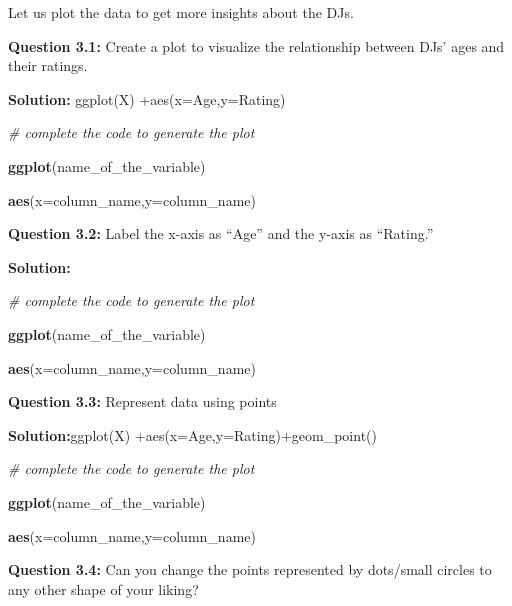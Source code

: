 \documentclass[
]{article}
\newenvironment{Shaded}{\begin{snugshade}}{\end{snugshade}}
\newcommand{\AttributeTok}[1]{\textcolor[rgb]{0.13,0.29,0.53}{#1}}
\newcommand{\CommentTok}[1]{\textcolor[rgb]{0.56,0.35,0.01}{\textit{#1}}}
\newcommand{\FunctionTok}[1]{\textcolor[rgb]{0.13,0.29,0.53}{\textbf{#1}}}
\newcommand{\NormalTok}[1]{#1}
\begin{document}
Let us plot the data to get more insights about the DJs.

\textbf{Question 3.1:} Create a plot to visualize the relationship
between DJs' ages and their ratings.

\textbf{Solution:} ggplot(X) +aes(x=Age,y=Rating)

\begin{Shaded}
\begin{Highlighting}[]
\CommentTok{\# complete the code to generate the plot}

\FunctionTok{ggplot}\NormalTok{(name\_of\_the\_variable) }

\FunctionTok{aes}\NormalTok{(}\AttributeTok{x=}\NormalTok{column\_name,}\AttributeTok{y=}\NormalTok{column\_name)}
\end{Highlighting}
\end{Shaded}

\textbf{Question 3.2:} Label the x-axis as ``Age'' and the y-axis as
``Rating.''

\textbf{Solution:}

\begin{Shaded}
\begin{Highlighting}[]
\CommentTok{\# complete the code to generate the plot}

\FunctionTok{ggplot}\NormalTok{(name\_of\_the\_variable) }

\FunctionTok{aes}\NormalTok{(}\AttributeTok{x=}\NormalTok{column\_name,}\AttributeTok{y=}\NormalTok{column\_name)}
\end{Highlighting}
\end{Shaded}

\textbf{Question 3.3:} Represent data using points

\textbf{Solution:}ggplot(X) +aes(x=Age,y=Rating)+geom\_point()

\begin{Shaded}
\begin{Highlighting}[]
\CommentTok{\# complete the code to generate the plot}

\FunctionTok{ggplot}\NormalTok{(name\_of\_the\_variable) }

\FunctionTok{aes}\NormalTok{(}\AttributeTok{x=}\NormalTok{column\_name,}\AttributeTok{y=}\NormalTok{column\_name)}
\end{Highlighting}
\end{Shaded}

\textbf{Question 3.4:} Can you change the points represented by
dots/small circles to any other shape of your liking?
\end{document}
